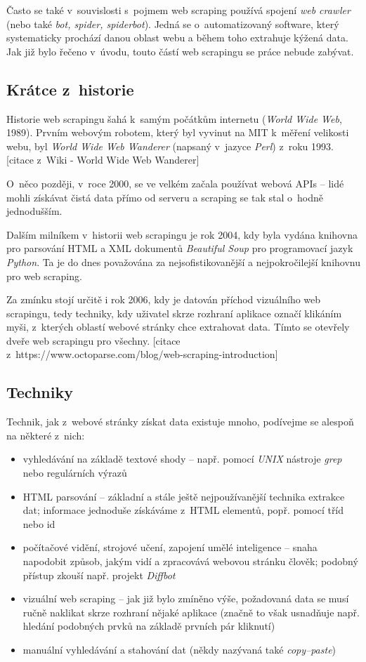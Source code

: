 \documentclass[thesis=B,czech]{FITthesis}[2012/06/26]
\begin{document}
Často se také v~souvislosti s~pojmem web scraping používá spojení \emph{web crawler} (nebo také \emph{bot, spider, spiderbot}). Jedná se o~automatizovaný software, který systematicky prochází danou oblast webu a během toho extrahuje kýžená data. Jak již bylo řečeno v~úvodu, touto částí web scrapingu se práce nebude zabývat.

\subsection{Krátce z~historie}
Historie web scrapingu šahá k~samým počátkům internetu (\emph{World Wide Web}, 1989). Prvním webovým robotem, který byl vyvinut na MIT k~měření velikosti webu, byl \emph{World Wide Web Wanderer} (napsaný v~jazyce \emph{Perl}) z~roku 1993. [citace z~Wiki - World Wide Web Wanderer] 

O~něco později, v~roce 2000, se ve velkém začala používat webová APIs -- lidé mohli získávat čistá data přímo od serveru a scraping se tak stal o~hodně jednodušším. 

Dalším milníkem v~historii web scrapingu je rok 2004, kdy byla vydána knihovna pro parsování HTML a XML dokumentů \emph{Beautiful Soup} pro programovací jazyk \emph{Python}. Ta je do dnes považována za nejsofistikovanější a nejpokročilejší knihovnu pro web scraping.

Za zmínku stojí určitě i rok 2006, kdy je datován příchod vizuálního web scrapingu, tedy techniky, kdy uživatel skrze rozhraní  aplikace označí klikáním myši, z~kterých oblastí webové stránky chce extrahovat data. Tímto se otevřely dveře web scrapingu pro všechny. [citace z~https://www.octoparse.com/blog/web-scraping-introduction]

\subsection{Techniky}
Technik, jak z~webové stránky získat data existuje mnoho, podívejme se alespoň na některé z~nich:
\begin{itemize}
	\item vyhledávání na základě textové shody -- např. pomocí \emph{UNIX} nástroje \emph{grep} nebo regulárních výrazů
	\item HTML parsování -- základní a stále ještě nejpoužívanější technika extrakce dat; informace jednoduše získáváme z~HTML elementů, popř. pomocí tříd nebo id
	\item počítačové vidění, strojové učení, zapojení umělé inteligence -- snaha napodobit způsob, jakým vidí a zpracovává webovou stránku člověk; podobný přístup zkouší např. projekt \emph{Diffbot}
	\item vizuální web scraping -- jak již bylo zmíněno výše, požadovaná data se musí ručně naklikat skrze rozhraní nějaké aplikace (značně to však usnadňuje např. hledání podobných prvků na základě prvních pár kliknutí)
	\item manuální vyhledávání a stahování dat (někdy nazývaná také \emph{copy--paste})
\end{itemize}
\end{document}
